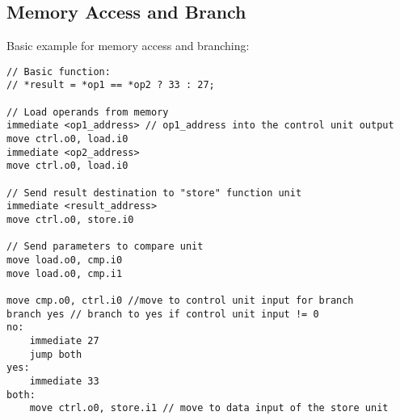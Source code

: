\documentclass[adraft]{eptcs}
\begin{document}
	\newpage
	\begin{appendices}
		\newpage
		\section{Memory Access and Branch}
			\label{app:ex1}
			
			Basic example for memory access and branching:
			
			\begin{lstlisting}
// Basic function:
// *result = *op1 == *op2 ? 33 : 27;

// Load operands from memory
immediate <op1_address> // op1_address into the control unit output
move ctrl.o0, load.i0
immediate <op2_address>
move ctrl.o0, load.i0

// Send result destination to "store" function unit
immediate <result_address>
move ctrl.o0, store.i0

// Send parameters to compare unit
move load.o0, cmp.i0
move load.o0, cmp.i1

move cmp.o0, ctrl.i0 //move to control unit input for branch
branch yes // branch to yes if control unit input != 0
no:
	immediate 27
	jump both
yes:
	immediate 33
both:
	move ctrl.o0, store.i1 // move to data input of the store unit
			\end{lstlisting}
	
	\end{appendices}
	
\end{document}
